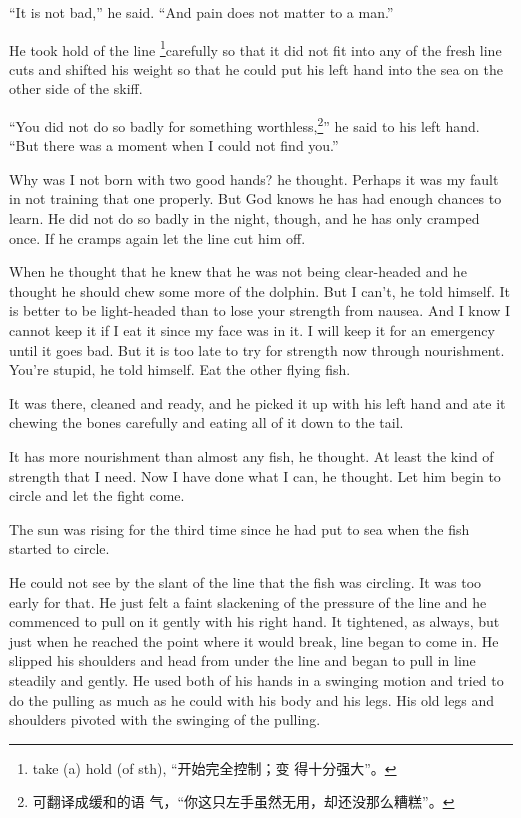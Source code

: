 \documentclass[fontset=ubuntu]{ctexrep}
\begin{document}
``It is not bad,'' he said. ``And pain does not matter to a man.''

He took hold of the line \footnote{take (a) hold (of sth), “开始完全控制；变
  得十分强大”。}carefully so that it did not fit into any of the fresh line
cuts and shifted his weight so that he could put his left hand into the sea
on the other side of the skiff.

``You did not do so badly for something worthless,\footnote{可翻译成缓和的语
  气，“你这只左手虽然无用，却还没那么糟糕”。}'' he said to his left hand.
``But there was a moment when I could not find you.''

Why was I not born with two good hands? he thought. Perhaps it was my fault
in not training that one properly. But God knows he has had enough chances
to learn. He did not do so badly in the night, though, and he has only
cramped once. If he cramps again let the line cut him off.

When he thought that he knew that he was not being \gls{clear-headed} and he
thought he should chew some more of the dolphin. But I can't, he told
himself. It is better to be \gls{light-headed} than to lose your strength from
nausea. And I know I cannot keep it if I eat it since my face was in it. I
will keep it for an \gls{emergency} until it goes bad. But it is too late to try
for strength now through \gls{nourishment}. You're stupid, he told himself. Eat
the other flying fish.

It was there, cleaned and ready, and he picked it up with his left hand and
ate it chewing the bones carefully and eating all of it down to the tail.

It has more nourishment than almost any fish, he thought. At least the kind
of strength that I need. Now I have done what I can, he thought. Let him
begin to circle and let the fight come.

The sun was rising for the third time since he had put to sea when the fish
started to circle.

He could not see by the slant of the line that the fish was circling. It was
too early for that. He just felt a faint \gls{slackening} of the pressure of
the line and he commenced to pull on it gently with his right hand. It
tightened, as always, but just when he reached the point where it would
break, line began to come in. He slipped his shoulders and head from under
the line and began to pull in line steadily and gently. He used both of his
hands in a swinging motion and tried to do the pulling as much as he could
with his body and his legs. His old legs and shoulders pivoted with the
swinging of the pulling.
\end{document}
